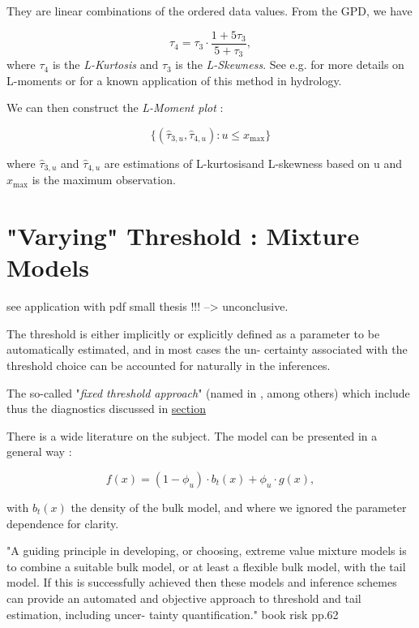 \documentclass[11pt,a4paper,openany ]{book}
\begin{document}
They are linear combinations of the ordered data values. 
From the GPD, we have 

\begin{equation}
\tau_4=\tau_3\cdot \frac{1+5\tau_3}{5+\tau_3},
\end{equation}
where $\tau_4$ is the \emph{L-Kurtosis} and $\tau_3$ is the \emph{L-Skewness}. See e.g. \citet{hosking_regional_1997} for more details on L-moments or \citet{peel_utility_2001} for a known application of this method in hydrology.

We can then construct the \emph{L-Moment plot} :

\begin{equation}
\Big\{(\hat{\tau}_{3,u},\hat{\tau}_{4,u}) : u\leq x_{\text{max}}\Big\}
\end{equation}

where $\hat{\tau}_{3,u}$ and $\hat{\tau}_{4,u}$ are estimations of L-kurtosisand L-skewness based on u and $x_{\text{max}}$ is the maximum observation.






\section{"Varying" Threshold : Mixture Models}
\citet{dey_extreme_2016}

see application with pdf small thesis !!! --> unconclusive.

The threshold is either implicitly or explicitly
defined as a parameter to be automatically estimated, and in most cases the un-
certainty associated with the threshold choice can be accounted for naturally in
the inferences.

The so-called "\emph{fixed threshold approach}" (named in 
\citet{hu_evmix:_2014}, among others) which include thus the 
diagnostics discussed in \hyperref[stdthr]{section \textbf{}}


There is a wide literature on the subject. The model can be presented in a general way : 

\begin{equation}
f(x)=(1-\phi_u)\cdot b_t(x)+\phi_u\cdot g(x),
\end{equation}

with $b_t(x)$ the density of the bulk model, and where we ignored the parameter dependence for clarity.

"A guiding principle in developing, or choosing, extreme value mixture models is to
combine a suitable bulk model, or at least a flexible bulk model, with the tail model. If
this is successfully achieved then these models and inference schemes can provide an
automated and objective approach to threshold and tail estimation, including uncer-
tainty quantification." book risk pp.62
\end{document}
